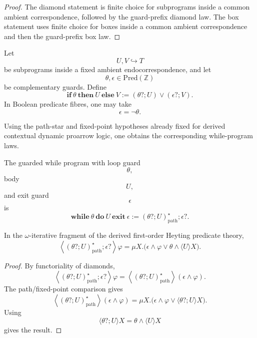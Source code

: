 \begin{proof}
The diamond statement is finite choice for subprograms inside a common ambient
correspondence, followed by the guard-prefix diamond law.  The box statement
uses finite choice for boxes inside a common ambient correspondence and then
the guard-prefix box law.
\end{proof}

\begin{definition}
\label{def:derived-poly-internal-conditional}
Let
\[
U,V\hookrightarrow T
\]
be subprograms inside a fixed ambient endocorrespondence, and let
\[
\theta,\epsilon\in\mathrm{Pred}(\mathbb Z)
\]
be complementary guards.  Define
\[
\mathbf{if}\ \theta\ \mathbf{then}\ U\ \mathbf{else}\ V
:=
(\theta?;U)\vee(\epsilon?;V).
\]
In Boolean predicate fibres, one may take
\[
\epsilon=\neg\theta.
\]
\end{definition}

Using the path-star and fixed-point hypotheses already fixed for derived
contextual dynamic proarrow logic, one obtains the corresponding while-program
laws.

\begin{definition}
\label{def:derived-poly-guarded-while}
The guarded while program with loop guard
\[
\theta,
\]
body
\[
U,
\]
and exit guard
\[
\epsilon
\]
is
\[
\mathbf{while}\ \theta\ \mathbf{do}\ U\ \mathbf{exit}\ \epsilon
:=
(\theta?;U)^\star_{\mathrm{path}};\epsilon?.
\]
\end{definition}

\begin{theorem}
\label{thm:derived-poly-while-diamond}
In the \(\omega\)-iterative fragment of the derived first-order Heyting
predicate theory,
\[
\left\langle
(\theta?;U)^\star_{\mathrm{path}};\epsilon?
\right\rangle\varphi
=
\mu X.\bigl(
\epsilon\wedge\varphi
\vee
\theta\wedge\langle U\rangle X
\bigr).
\]
\end{theorem}

\begin{proof}
By functoriality of diamonds,
\[
\left\langle
(\theta?;U)^\star_{\mathrm{path}};\epsilon?
\right\rangle\varphi
=
\left\langle
(\theta?;U)^\star_{\mathrm{path}}
\right\rangle
(\epsilon\wedge\varphi).
\]
The path/fixed-point comparison gives
\[
\left\langle
(\theta?;U)^\star_{\mathrm{path}}
\right\rangle
(\epsilon\wedge\varphi)
=
\mu X.\bigl(
\epsilon\wedge\varphi
\vee
\langle\theta?;U\rangle X
\bigr).
\]
Using
\[
\langle\theta?;U\rangle X
=
\theta\wedge\langle U\rangle X
\]
gives the result.
\end{proof}

